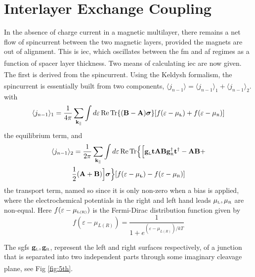 \documentclass[a4paper, 12pt]{article}
\newcommand{\site}[1]{\textsuperscript{\textcolor{blue}{\cite{#1}}}}
\begin{document}
	\section{Interlayer Exchange Coupling}
	\par In the absence of charge current in a magnetic multilayer, there remains a net flow of spincurrent between the two magnetic layers, provided the magnets are out of alignment. This is \gls{iec}, which oscillates between the \gls{fm} and \gls{af} regimes as a function of spacer layer thickness\site{Parkin}. 
	Two means of calculating \gls{iec} are now given. The first is derived from the spincurrent.
	Using the Keldysh formalism\textsuperscript{\textcolor{blue}{\cite{keldyshorig}}}, the spincurrent is essentially built from two components, $\langle j_{n-1}\rangle = \langle j_{n-1}\rangle_1 + \langle j_{n-1}\rangle_2$\textcolor{blue}{\textsuperscript{\cite{keldysh_3}}}.
with 
\begin{equation}\label{keldysh_1}
	\langle j_{n-1}\rangle_1 = \frac{1}{4\pi}\sum_{\bf k_\parallel}\int d\varepsilon \,\rm Re \, Tr \lbrace\bf (B-A)\bm\sigma\rbrace [\mathnormal f(\varepsilon - \mu_{\scriptscriptstyle L})+\mathnormal f(\varepsilon - \mu_{\rm\scriptscriptstyle R})]
\end{equation}
the equilibrium term, and
\begin{multline}\label{keldysh}
	\langle j_{n-1}\rangle_2 = \frac{1}{2\pi}\sum_{\bf k_\parallel}\int d\varepsilon \,\rm Re \, Tr \Big\lbrace\Big\lbrack\bf g_{\rm\scriptscriptstyle L} t A B g_{\rm \scriptscriptstyle R}^\dag t^\dag-AB+\\{\rm\frac{1}{2}} \bf(A+B)\Big\rbrack\bm\sigma\Big\rbrace [\mathnormal f(\varepsilon - \mu_{\scriptscriptstyle L})-\mathnormal f(\varepsilon - \mu_{\rm\scriptscriptstyle R})]
\end{multline}
the transport term, named so since it is only non-zero when a bias is applied, where the electrochemical potentials in the right and left hand leads $\mu_{\rm \scriptscriptstyle L}, \mu_{\rm \scriptscriptstyle R}$ are non-equal. Here $f(\varepsilon-\mu_{\rm \scriptscriptstyle L(R)})$ is the Fermi-Dirac distribution function given by
\begin{equation}\label{fermi}
	f(\varepsilon-\mu_{\scriptscriptstyle L(R)})=\frac{1}{1+e^{(\varepsilon-\mu_{\scriptscriptstyle L(R)})/kT}}
\end{equation}
\par The \gls{sgf}s $\bf g_{\rm\scriptscriptstyle L}, g_{\rm\scriptscriptstyle R}$, represent the left and right surfaces respectively, of a junction that is separated into two independent parts through some imaginary cleavage plane\textcolor{blue}{\textsuperscript{\cite{kubo2}}}, see Fig \ref{fig:5th}.
\end{document}
